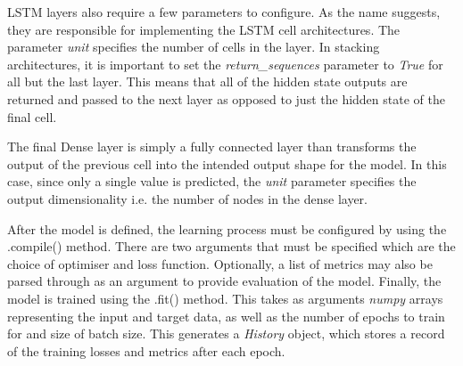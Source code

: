 \documentclass[10pt,onecolumn,letterpaper]{article}
\begin{document}
LSTM layers also require a few parameters to configure. As the name suggests, they are responsible for implementing the LSTM cell architectures. The parameter \textit{unit} specifies the number of cells in the layer. In stacking architectures, it is important to set the \textit{return\_sequences} parameter to \textit{True} for all but the last layer. This means that all of the hidden state outputs are returned and passed to the next layer as opposed to just the hidden state of the final cell. 

The final Dense layer is simply a fully connected layer than transforms the output of the previous cell into the intended output shape for the model. In this case, since only a single value is predicted, the \textit{unit} parameter specifies the output dimensionality i.e. the number of nodes in the dense layer.

After the model is defined, the learning process must be configured by using the .compile() method. There are two arguments that must be specified which are the choice of optimiser and loss function. Optionally, a list of metrics may also be parsed through as an argument to provide evaluation of the model. Finally, the model is trained using the .fit() method. This takes as arguments \textit{numpy} arrays representing the input and target data, as well as the number of epochs to train for and size of batch size. This generates a \textit{History} object, which stores a record of the training losses and metrics after each epoch.
\end{document}
